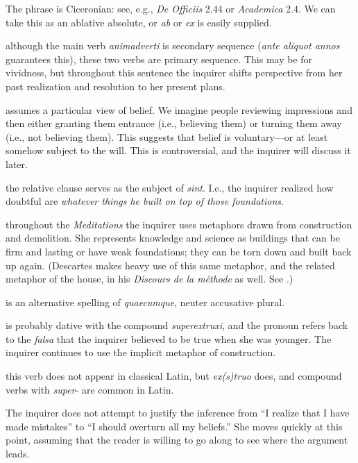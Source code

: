  The phrase is Ciceronian: see, e.g., \textit{De Officiis} 2.44 or \textit{Academica} 2.4. We can take this as an ablative absolute, or \textit{ab} or \textit{ex} is easily supplied.

 although the main verb \textit{animadverti} is secondary sequence (\textit{ante aliquot annos} guarantees this), these two verbs are primary sequence. This may be for vividness, but throughout this sentence the inquirer shifts perspective from her past realization and resolution to her present plans.

 assumes a particular view of belief. We imagine people reviewing impressions and then either granting them entrance (i.e., believing them) or turning them away (i.e., not believing them). This suggests that belief is voluntary---or at least somehow subject to the will. This is controversial, and the inquirer will discuss it later.

 the relative clause serves as the subject of \textit{sint}. I.e., the inquirer realized how doubtful are \textit{whatever things he built on top of those foundations}.

 throughout the \textit{Meditations} the inquirer uses metaphors drawn from construction and demolition. She represents knowledge and science as buildings that can be firm and lasting or have weak foundations; they can be torn down and built back up again. (Descartes makes heavy use of this same metaphor, and the related metaphor of the house, in his \textit{Discours de la méthode} as well. See \cite[22]{curtis1984}.)

 is an alternative spelling of \textit{quaecumque}, neuter accusative plural.

 is probably dative with the compound \textit{superextruxi}, and the pronoun refers back to the \textit{falsa} that the inquirer believed to be true when she was younger. The inquirer continues to use the implicit metaphor of construction.

 this verb does not appear in classical Latin, but \textit{ex(s)truo} does, and compound verbs with \textit{super}- are common in Latin.

 The inquirer does not attempt to justify the inference from ``I realize that I have made mistakes'' to ``I should overturn all my beliefs.'' She moves quickly at this point, assuming that the reader is willing to go along to see where the argument leads. 

